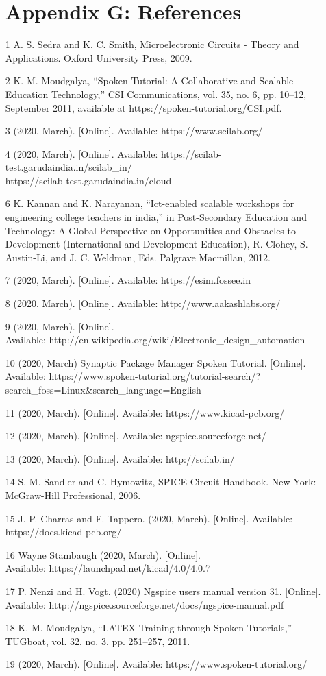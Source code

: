 \begin{enumerate}
\section {Appendix G: References}
\item [1] A. S. Sedra and K. C. Smith, Microelectronic Circuits - Theory and Applications. Oxford University Press, 2009. 
\item [2] K. M. Moudgalya, “Spoken Tutorial: A Collaborative and Scalable Education Technology,” CSI Communications, vol. 35, no. 6, pp. 10–12, September 2011, available at https://spoken-tutorial.org/CSI.pdf. 
\item [3] (2020, March). [Online]. Available: https://www.scilab.org/ 
\item [4] (2020, March). [Online].
Available: https://scilab-test.garudaindia.in/scilab\_in/ \\
https://scilab-test.garudaindia.in/cloud 
\item [6]  K. Kannan and K. Narayanan, “Ict-enabled scalable workshops for engineering college teachers in india,” in Post-Secondary Education and Technology: A Global Perspective on Opportunities and Obstacles to Development (International and Development Education), R. Clohey, S. Austin-Li, and J. C. Weldman, Eds. Palgrave Macmillan, 2012. 
\item [7]  (2020, March). [Online]. Available: https://esim.fossee.in 
\item [8] (2020, March). [Online]. Available: http://www.aakashlabs.org/ 
\item [9] (2020, March). [Online]. \\
Available: http://en.wikipedia.org/wiki/Electronic\_design\_automation
\item [10] (2020, March) Synaptic Package Manager Spoken Tutorial. [Online]. Available: https://www.spoken-tutorial.org/tutorial-search/?search\_foss=Linux&search\_language=English 
\item [11] (2020, March). [Online]. Available: https://www.kicad-pcb.org/
\item [12] (2020, March). [Online]. Available: ngspice.sourceforge.net/
\item [13] (2020, March). [Online]. Available: http://scilab.in/ 
\item [14]   S. M. Sandler and C. Hymowitz, SPICE Circuit Handbook. New York: McGraw-Hill Professional, 2006. 
\item [15]   J.-P. Charras and F. Tappero. (2020, March). [Online]. Available: https://docs.kicad-pcb.org/
\item [16] Wayne Stambaugh (2020, March). [Online]. \\
Available: https://launchpad.net/kicad/4.0/4.0.7 
\item   [17]   P. Nenzi and H. Vogt. (2020) Ngspice users manual version 31. [Online]. \\
Available: http://ngspice.sourceforge.net/docs/ngspice-manual.pdf 
\item [18]   K. M. Moudgalya, “LATEX Training through Spoken Tutorials,” TUGboat, vol. 32, no. 3, pp. 251–257, 2011. 
\item [19]   (2020, March). [Online]. Available: https://www.spoken-tutorial.org/ 
\end{enumerate}
